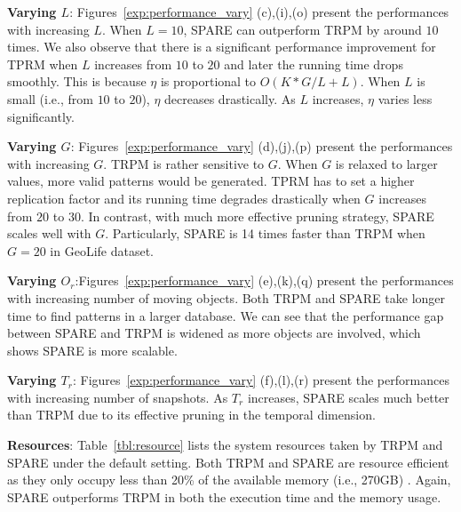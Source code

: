 \textbf{Varying $L$}: Figures~\ref{exp:performance_vary} (c),(i),(o) present the performances with increasing $L$. When $L=10$, SPARE can outperform TRPM by around $10$ times. We also observe that there is a significant performance improvement for TPRM when $L$ increases from $10$ to $20$ and later the running time drops smoothly. 
This is because $\eta$ is proportional to $O(K*G/L+L)$. When $L$ is small (i.e., from $10$ to $20$),
$\eta$ decreases drastically. As $L$ increases, $\eta$ varies less significantly.

\textbf{Varying $G$}: Figures~\ref{exp:performance_vary} (d),(j),(p) present the performances with increasing $G$.  TRPM is rather sensitive to $G$. When $G$ is relaxed to larger values, more valid patterns would be generated. TPRM has to set a higher replication factor and its running time degrades drastically when $G$ increases from $20$ to $30$. In contrast, with much more effective pruning strategy, SPARE scales well with $G$. Particularly, SPARE is 14 times faster than TRPM when $G=20$ in GeoLife dataset.

\textbf{Varying $O_r$}:Figures~\ref{exp:performance_vary} (e),(k),(q) present the performances with increasing number of moving objects. Both TRPM and SPARE take longer time to find patterns in a larger database. We can see that the performance gap between SPARE and TRPM is widened as more objects are involved, which shows SPARE is more scalable.

\textbf{Varying $T_r$}: Figures~\ref{exp:performance_vary} (f),(l),(r) present 
the performances with increasing number of snapshots. As $T_r$ increases, SPARE scales much better than TRPM due to its effective pruning in the temporal dimension. 


\textbf{Resources}: Table~\ref{tbl:resource} lists the system resources taken 
by TRPM and SPARE under the default setting. Both TRPM and SPARE are 
resource efficient as they only occupy less than 20\% 
of the available memory (i.e., 270GB) . Again, SPARE outperforms TRPM in both the execution time and the memory usage.



